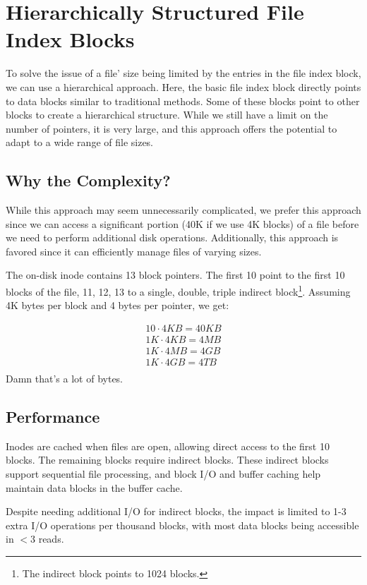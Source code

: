 \documentclass{report}
\newcommand{\exampleBegin}[1]{\begin{tcolorbox}[colback=blue!5!white,colframe=black!75!blue,title={Example:
      #1}]}
\newcommand{\exampleEnd}{\end{tcolorbox}}
\begin{document}
\section{Hierarchically Structured File Index Blocks}
To solve the issue of a file' size being limited by the entries in the file index block, we can use
a hierarchical approach. Here, the basic file index block directly points to data blocks similar to
traditional methods. Some of these blocks point to other blocks to create a hierarchical
structure. While we still have a limit on the number of pointers, it is very large, and this
approach offers the potential to adapt to a wide range of file sizes.


\subsection{Why the Complexity?}
While this approach may seem unnecessarily complicated, we prefer this approach since we can access
a significant portion (40K if we use 4K blocks) of a file before we need to perform additional disk
operations. Additionally, this approach is favored since it can efficiently manage files of varying
sizes.

\exampleBegin{File Sizes Round 2}
The on-disk inode contains 13 block pointers. The first 10 point to the first 10 blocks of the file,
11, 12, 13 to a single, double, triple indirect block\footnote{The indirect block points to 1024
  blocks.}. Assuming 4K bytes per block and 4 bytes per pointer, we get:

\begin{align*}
  10 \cdot 4KB = 40KB \\
  1K \cdot 4KB = 4MB \\
  1K \cdot 4MB = 4GB \\
  1K \cdot 4GB = 4TB \\
\end{align*}
Damn that's a lot of bytes.
\exampleEnd

\subsection{Performance}
Inodes are cached when files are open, allowing direct access to the first 10 blocks. The remaining
blocks require indirect blocks. These indirect blocks support sequential file processing, and block
I/O and buffer caching help maintain data blocks in the buffer cache.

Despite needing additional I/O for indirect blocks, the impact is limited to 1-3 extra I/O
operations per thousand blocks, with most data blocks being accessible in $< 3$ reads.
\end{document}
